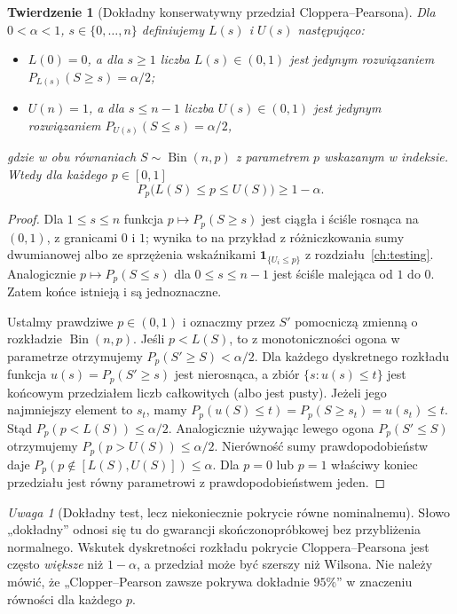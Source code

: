 \documentclass[11pt,a4paper,oneside]{report}
\numberwithin{equation}{chapter}
\theoremstyle{plain}
\newtheorem{twierdzenie}{Twierdzenie}[chapter]
\theoremstyle{definition}
\theoremstyle{remark}
\newtheorem{uwaga}{Uwaga}[chapter]
\newcommand{\ind}[1]{\mathbf 1_{#1}}
\DeclareMathOperator{\Bin}{Bin}
\begin{document}
\begin{twierdzenie}[Dokładny konserwatywny przedział Cloppera--Pearsona]
\label{thm:clopper-pearson}
Dla $0<\alpha<1$, $s\in\{0,\ldots,n\}$ definiujemy
$L(s)$ i $U(s)$ następująco:
\begin{itemize}
\item $L(0)=0$, a dla $s\ge1$ liczba $L(s)\in(0,1)$
jest jedynym rozwiązaniem $P_{L(s)}(S\ge s)=\alpha/2$;
\item $U(n)=1$, a dla $s\le n-1$ liczba $U(s)\in(0,1)$
jest jedynym rozwiązaniem $P_{U(s)}(S\le s)=\alpha/2$,
\end{itemize}
gdzie w obu równaniach $S\sim\Bin(n,p)$ z parametrem
$p$ wskazanym w indeksie. Wtedy dla każdego $p\in[0,1]$
\[
 P_p\bigl(L(S)\le p\le U(S)\bigr)\ge1-\alpha.
\]
\end{twierdzenie}
\begin{proof}
Dla $1\le s\le n$ funkcja
$p\mapsto P_p(S\ge s)$ jest ciągła i ściśle rosnąca
na $(0,1)$, z granicami $0$ i $1$; wynika to na przykład
z różniczkowania sumy dwumianowej albo ze sprzężenia
wskaźnikami $\ind{\{U_i\le p\}}$ z rozdziału~\ref{ch:testing}.
Analogicznie $p\mapsto P_p(S\le s)$ dla
$0\le s\le n-1$ jest ściśle malejąca od $1$ do $0$.
Zatem końce istnieją i są jednoznaczne.

Ustalmy prawdziwe $p\in(0,1)$ i oznaczmy przez
$S'$ pomocniczą zmienną o rozkładzie $\Bin(n,p)$.
Jeśli $p<L(S)$, to z monotoniczności ogona w parametrze
otrzymujemy $P_p(S'\ge S)<\alpha/2$.
Dla każdego dyskretnego rozkładu funkcja
$u(s)=P_p(S'\ge s)$ jest nierosnąca, a zbiór
$\{s:u(s)\le t\}$ jest końcowym przedziałem liczb
całkowitych (albo jest pusty). Jeżeli jego najmniejszy
element to $s_t$, mamy
$P_p(u(S)\le t)=P_p(S\ge s_t)=u(s_t)\le t$.
Stąd $P_p(p<L(S))\le\alpha/2$.
Analogicznie używając lewego ogona $P_p(S'\le S)$
otrzymujemy $P_p(p>U(S))\le\alpha/2$.
Nierówność sumy prawdopodobieństw daje
$P_p(p\notin[L(S),U(S)])\le\alpha$.
Dla $p=0$ lub $p=1$ właściwy koniec przedziału jest
równy parametrowi z prawdopodobieństwem jeden.
\end{proof}

\begin{uwaga}[Dokładny test, lecz niekoniecznie pokrycie równe nominalnemu]
Słowo „dokładny” odnosi się tu do gwarancji skończonopróbkowej
bez przybliżenia normalnego. Wskutek dyskretności rozkładu
pokrycie Cloppera--Pearsona jest często \emph{większe} niż
$1-\alpha$, a przedział może być szerszy niż Wilsona.
Nie należy mówić, że „Clopper--Pearson zawsze pokrywa dokładnie
$95\%$” w znaczeniu równości dla każdego $p$.
\end{uwaga}
\end{document}
